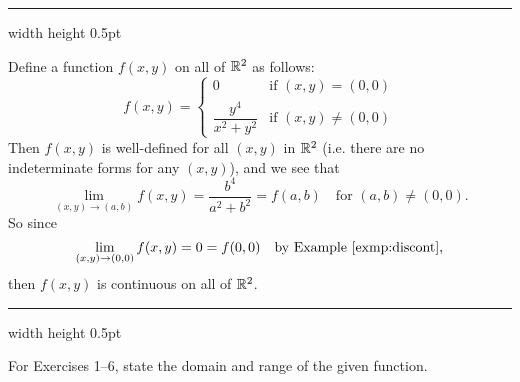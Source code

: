 \vspace{4mm}
\hrule width \textwidth height 0.5pt
\begin{exmp}
 Define a function $f(x,y)$ on all of $\mathbb{R}^{2}$ as follows:
 \begin{displaymath}
  f(x,y) =
  \begin{cases}
   0 & \text{if $(x,y) = (0,0)$}\\
   \dfrac{y^4}{x^2 + y^2} & \text{if $(x,y) \ne (0,0)$}
  \end{cases}
 \end{displaymath}
 Then $f(x,y)$ is well-defined for all $(x,y)$ in $\mathbb{R}^{2}$ (i.e. there are no indeterminate forms for any
 $(x,y)$), and we see that
 \begin{displaymath}
  \lim_{(x,y) \to (a,b)} f(x,y) = \frac{b^4}{a^2 + b^2} = f(a,b) \text{~~~for $(a,b) \ne (0,0)$.}
 \end{displaymath}
 So since 
 \begin{displaymath}
  \lim_{(x,y) \to (0,0)} f(x,y) = 0 = f(0,0) \text{~~~by Example \ref{exmp:discont},}
 \end{displaymath}
 then $f(x,y)$ is continuous on all of $\mathbb{R}^{2}$.
\end{exmp}
\hrule width \textwidth height 0.5pt
\newpage
\centerline{}\label{sec2dot1}
\par\noindent For Exercises 1--6, state the domain and range of the given function.
